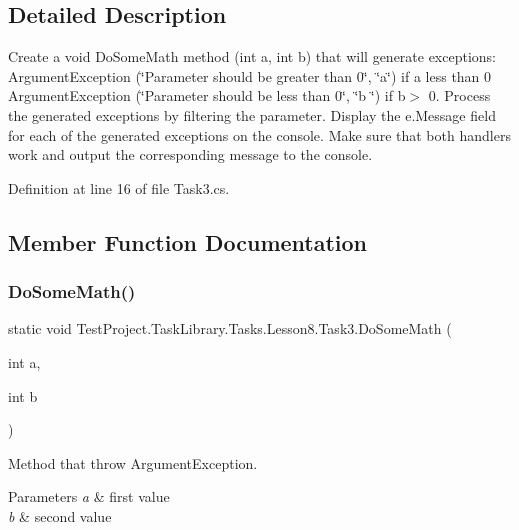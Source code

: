 \subsection{Detailed Description}
Create a void Do\+Some\+Math method (int a, int b) that will generate exceptions\+: Argument\+Exception (\char`\"{}\+Parameter should be greater than 0\char`\"{}, \char`\"{}a\char`\"{}) if a less than 0 Argument\+Exception (\char`\"{}\+Parameter should be less than 0\char`\"{}, \char`\"{}b \char`\"{}) if b$>$ 0. Process the generated exceptions by filtering the parameter. Display the e.\+Message field for each of the generated exceptions on the console. Make sure that both handlers work and output the corresponding message to the console. 



Definition at line 16 of file Task3.\+cs.



\subsection{Member Function Documentation}
\mbox{\label{class_test_project_1_1_task_library_1_1_tasks_1_1_lesson8_1_1_task3_a36a4bb94a00925fd4f42e78bd0132886}} 
\subsubsection{\texorpdfstring{DoSomeMath()}{DoSomeMath()}}
{\footnotesize\ttfamily static void Test\+Project.\+Task\+Library.\+Tasks.\+Lesson8.\+Task3.\+Do\+Some\+Math (\begin{DoxyParamCaption}\item[{int}]{a,  }\item[{int}]{b }\end{DoxyParamCaption})\hspace{0.3cm}{\ttfamily [static]}}



Method that throw Argument\+Exception. 


\begin{DoxyParams}{Parameters}
{\em a} & first value\\
\hline
{\em b} & second value\\
\hline
\end{DoxyParams}


